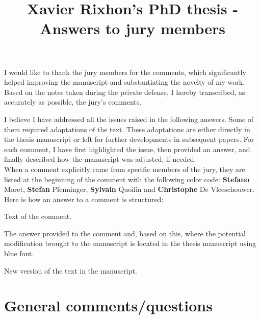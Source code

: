 \documentclass[12pt,a4paper]{article}
\title{\vspace{-1cm}
\begin{flushleft} {\sffamily Xavier Rixhon's PhD thesis - Answers to jury members}\end{flushleft}}
\date{\vspace{-1.7cm}\begin{flushleft}\sffamily Exploration of uncertainty-aware energy transition pathways - Reinforcement learning and principal component analysis-based methods\end{flushleft}}
\begin{document}
\maketitle

I would like to thank the jury members for the comments, which significantly helped improving the manuscript and substantiating the novelty of my work. Based on the notes taken during the private defense, I hereby transcribed, as accurately as possible, the jury's comments. 

I believe I have addressed all the issues raised in the following answers. Some of them required adaptations of the text. These adaptations are either directly in the thesis manuscript or left for further developments in subsequent papers. For each comment, I have first highlighted the issue, then provided an answer, and finally described how the manuscript was adjusted, if needed.\\

When a comment explicitly came from specific members of the jury, they are listed at the beginning of the comment with the following color code: {\color{orange} \textbf{Stefano} Moret}, {\color{teal} \textbf{Stefan} Pfenninger}, {\color{purple} \textbf{Sylvain} Quoilin} and {\color{violet} \textbf{Christophe} De Vleeschouwer}. Here is how an answer to a comment is structured:

\begin{mdframed}[style=comment] %
Text of the comment.
\end{mdframed}

\noindent The answer provided to the comment and, based on this, where the potential modification brought to the manuscript is located in the thesis manuscript using {\color{blue} blue font}.

\begin{mdframed}[style=manuscript] %
New version of the text in the manuscript.
\end{mdframed}


\clearpage

\section{General comments/questions}
\label{General}
\end{document}
